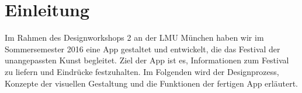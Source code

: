 \section{Einleitung}
Im Rahmen des Designworkshops 2 an der LMU München haben wir im Sommersemester 2016 eine App gestaltet und entwickelt, die das Festival der unangepassten Kunst begleitet. Ziel der App ist es, Informationen zum Festival zu liefern und Eindrücke festzuhalten. Im Folgenden wird der Designprozess, Konzepte der visuellen Gestaltung und die Funktionen der fertigen App erläutert. 